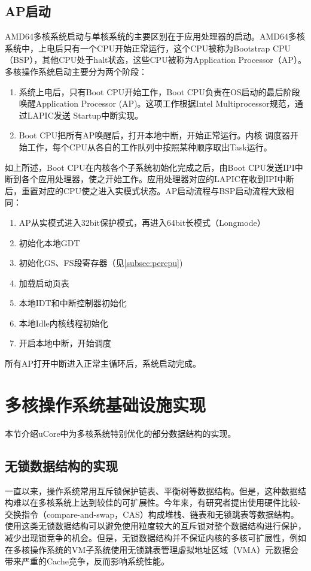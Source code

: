 \subsection{AP启动}
AMD64多核系统启动与单核系统的主要区别在于应用处理器的启动。AMD64多核系统中，上电后只有一个CPU开始正常运行，这个CPU被称为Bootstrap CPU（BSP），其他CPU处于halt状态，这些CPU被称为Application Processor（AP）\cite{intelmp}。多核操作系统启动主要分为两个阶段：

	\begin{enumerate}
		\item 系统上电后，只有Boot CPU开始工作，Boot
	CPU负责在OS启动的最后阶段唤醒Application Processor
	(AP)。这项工作根据Intel Multiprocessor规范，通过LAPIC发送
	Startup中断实现。

		\item Boot CPU把所有AP唤醒后，打开本地中断，开始正常运行。内核
	调度器开始工作，每个CPU从各自的工作队列中按照某种顺序取出Task运行。
	\end{enumerate}


如上所述，Boot CPU在内核各个子系统初始化完成之后，由Boot CPU发送IPI中断到各个应用处理器，使之开始工作。应用处理器对应的LAPIC在收到IPI中断后，重置对应的CPU使之进入实模式状态。AP启动流程与BSP启动流程大致相同：

\begin{enumerate}
\item AP从实模式进入32bit保护模式，再进入64bit长模式（Longmode）
\item 初始化本地GDT
\item 初始化GS、FS段寄存器（见\ref{subsec:percpu})
\item 加载启动页表
\item 本地IDT和中断控制器初始化
\item 本地Idle内核线程初始化
\item 开启本地中断，开始调度
\end{enumerate}

所有AP打开中断进入正常主循环后，系统启动完成。

\section{多核操作系统基础设施实现}
本节介绍uCore中为多核系统特别优化的部分数据结构的实现。

\subsection{无锁数据结构的实现}
一直以来，操作系统常用互斥锁保护链表、平衡树等数据结构。但是，这种数据结构难以在多核系统上达到较佳的可扩展性。今年来，有研究者\cite{Fraser:2007:CPW:1233307.1233309}提出使用硬件比较-交换指令（compare-and-swap，CAS）构成堆栈、链表和无锁跳表等数据结构。使用这类无锁数据结构可以避免使用粒度较大的互斥锁对整个数据结构进行保护，减少出现锁竞争的机会。但是，无锁数据结构并不保证内核的多核可扩展性，例如在多核操作系统的VM子系统使用无锁跳表管理虚拟地址区域（VMA）元数据会带来严重的Cache竞争\cite{radixvm:eurosys13}，反而影响系统性能。


